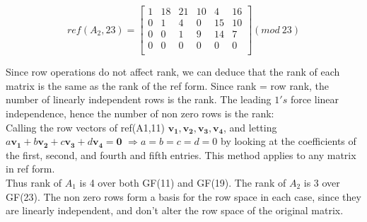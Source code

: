 \documentclass[10pt,a4paper]{report}
\begin{document}
\vspace{5mm}

\begin{equation*}
ref(A_2,23)=\begin{bmatrix}
1 & 18 & 21 & 10 & 4 & 16\\
0 & 1 & 4 & 0 & 15 & 10\\
0 & 0 & 1 & 9 & 14 & 7\\
0 & 0 & 0 & 0 & 0 & 0\\
\end{bmatrix} (mod \: 23)
\end{equation*}

\vspace{5mm}

Since row operations do not affect rank, we can deduce that the rank of each matrix is the same as the rank of the ref form. Since rank = row rank, the number of linearly independent rows is the rank. The leading $1's$ force linear independence, hence the number of non zero rows is the rank:\\

Calling the row vectors of ref(A1,11) $\bm{v_1}, \bm{v_2}, \bm{v_3},\bm{v_4}$, and letting $a\bm{v_1} + b\bm{v_2} + c\bm{v_3} +d\bm{v_4}= \bm{0}$ $\Rightarrow a=b=c=d=0$ by looking at the coefficients of the first, second, and fourth and fifth entries. This method applies to any matrix in ref form. \\

%


Thus rank of $A_1$ is 4 over both GF(11) and GF(19). The rank of $A_2$  is 3 over GF(23). The non zero rows form a basis for the row space in each case, since they are linearly independent, and don't alter the row space of the original matrix.
\end{document}
